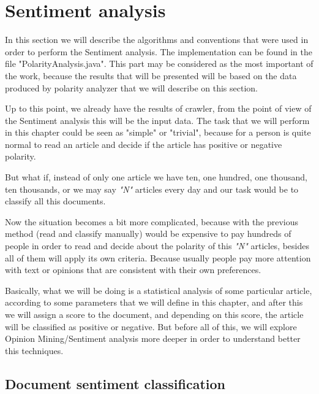 \clearpage
\section{Sentiment analysis}\label{sentimentAnalysis}

In this section we will describe the algorithms and conventions that were used in order to perform the Sentiment analysis. The implementation can be found in the file "PolarityAnalysis.java".
This part may be considered as the most important of the work, because the results that will be presented will be based on the data produced by polarity analyzer that we will describe on this section.

Up to this point, we already have the results of crawler, from the point of view of the Sentiment analysis this will be the input data. The task that we will perform in this chapter could be seen as "simple" or "trivial", because for a person is quite normal to read an article and decide if the article has positive or negative polarity.

But what if, instead of only one article we have ten, one hundred, one thousand, ten thousands, or we may say \textit{"N"} articles every day and our task would be to classify all this documents.

Now the situation becomes a bit more complicated, because with the previous method (read and classify manually) would be expensive to pay hundreds of people in order to read and decide about the polarity of this \textit{"N"} articles, besides all of them will apply its own criteria. \cite%
{L2011} Because usually people pay more attention with text or opinions that are consistent with their own preferences.

Basically, what we will be doing is a statistical analysis of some particular article, according to some parameters that we will define in this chapter, and after this we will assign a score to the document, and depending on this score, the article will be classified as positive or negative. But before all of this, we will explore Opinion Mining/Sentiment analysis more deeper in order to understand better this techniques. 

\subsection{Document sentiment classification}\label{documentSentimentClasification}

